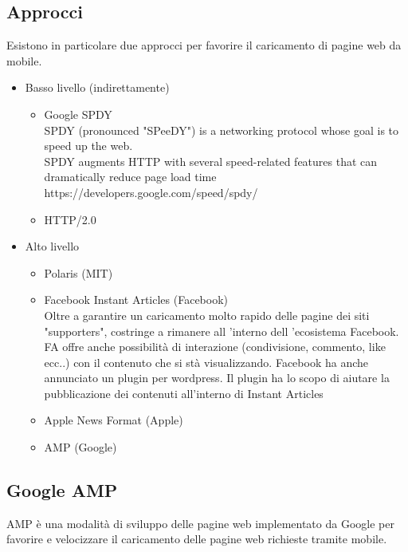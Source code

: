 \documentclass[a4paper]{article}
\begin{document}
\subsection{Approcci}
Esistono in particolare due approcci per favorire il caricamento di pagine web da mobile.
\begin{itemize}
    \item Basso livello (indirettamente)
    \begin{itemize}
        \item Google SPDY\\ 
        SPDY (pronounced "SPeeDY") is a networking protocol whose goal is to speed up the web.\\
        SPDY augments HTTP with several speed-related features that can dramatically reduce page load time\\
        https://developers.google.com/speed/spdy/
        \item HTTP/2.0
    \end{itemize}

    \item Alto livello
    \begin{itemize}
        \item Polaris (MIT)
        \item Facebook Instant Articles (Facebook)\\
        Oltre a garantire un caricamento molto rapido delle pagine dei siti "supporters", costringe a rimanere all ’interno dell ’ecosistema Facebook.
FA offre anche possibilità di interazione (condivisione, commento, like ecc..) con il contenuto che si stà visualizzando.
Facebook ha anche annunciato un plugin per wordpress. Il plugin ha lo scopo di aiutare la pubblicazione dei contenuti all’interno di Instant Articles

        \item Apple News Format (Apple)
        \item AMP (Google)
    \end{itemize}
\end{itemize}

\newpage
\subsection{Google AMP}
AMP è una modalità di sviluppo delle pagine web implementato da Google per favorire e velocizzare il caricamento delle pagine web richieste tramite mobile.
\end{document}
